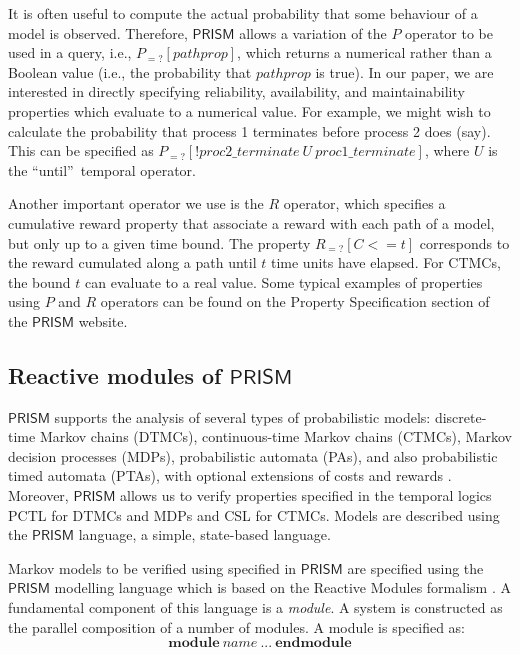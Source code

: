 \documentclass[preprint,12pt]{qrei}
\begin{document}
It is often useful to compute the actual probability that some behaviour of a model is observed. Therefore, $\mathsf{PRISM}$ allows a variation of the $P$ operator to be used in a query, i.e., $P_{=?}[pathprop]$, which returns a numerical rather than a Boolean value (i.e., the probability that $pathprop$ is true). In our paper, we are interested in directly specifying reliability, availability, and maintainability properties which evaluate to a numerical value. For example, we might wish to calculate the probability that process 1 terminates before process 2 does (say). This can be specified as $P_{=?} [ !proc2\_terminate\ U\ proc1\_terminate ]$, where $U$ is the \textquotedblleft until\textquotedblright\ temporal operator.

Another important operator we use is the $R$ operator, which specifies a cumulative reward property that associate a reward with each path of a model, but only up to a given time bound. The property $R_{=?}[ C<=t ]$  corresponds to the reward cumulated along a path until $t$ time units have elapsed. For CTMCs, the bound $t$ can evaluate to a real value. Some typical examples of properties using $P$ and $R$ operators can be found on the Property Specification section of the $\mathsf{PRISM}$ website.


\subsection{Reactive modules of $\mathsf{PRISM}$}

$\mathsf{PRISM}$ supports the analysis of several types of probabilistic models: discrete-time Markov chains (DTMCs), continuous-time Markov chains (CTMCs), Markov decision processes (MDPs), probabilistic automata (PAs), and also probabilistic timed automata (PTAs), with optional extensions of costs and rewards \cite{KNP09}. Moreover, $\mathsf{PRISM}$ allows us to verify properties specified in the temporal logics PCTL for DTMCs and MDPs and CSL for CTMCs. Models are described using the $\mathsf{PRISM}$ language, a simple, state-based language.

Markov models to be verified using specified in $\mathsf{PRISM}$ are specified using the $\mathsf{PRISM}$ modelling language which is based on the Reactive Modules formalism \cite{AH99}. A fundamental component of this language is a {\it module}. A system is constructed as the parallel composition of a number of modules. A module is specified as:
\[
\textbf{module}\ name\ ...\ \textbf{endmodule}
\]
\end{document}
